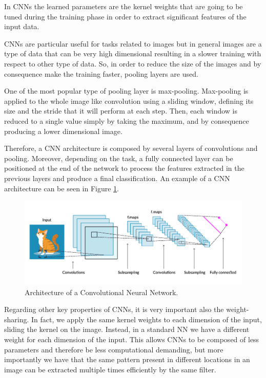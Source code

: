 \documentclass[binding=0.6cm,noexaminfo]{sapthesis}
\begin{document}
In CNNs the learned parameters are the kernel weights that are going to be tuned during the training phase in order to extract significant features of the input data. 

CNNs are particular useful for tasks related to images but in general images are a type of data that can be very high dimensional resulting in a slower training with respect to other type of data. So, in order to reduce the size of the images and by consequence make the training faster, pooling layers are used.

One of the most popular type of pooling layer is max-pooling. Max-pooling is applied to the whole image like convolution using a sliding window, defining its size and the stride that it will perform at each step. Then, each window is reduced to a single value simply by taking the maximum, and by consequence producing a lower dimensional image.

Therefore, a CNN architecture is composed by several layers of convolutions and pooling. Moreover, depending on the task, a fully connected layer can be positioned at the end of the network to process the features extracted in the previous layers and produce a final classification. An example of a CNN architecture can be seen in Figure \ref{fig:cnn}.

\begin{figure}[h!]
\centering
\includegraphics[width=\linewidth]{cnn}
\caption{Architecture of a Convolutional Neural Network.}
\label{fig:cnn}
\end{figure}

Regarding other key properties of CNNs, it is very important also the weight-sharing. In fact, we apply the same kernel weights to each dimension of the input, sliding the kernel on the image. Instead, in a standard NN we have a different weight for each dimension of the input. This allows CNNs to be composed of less parameters and therefore be less computational demanding, but more importantly we have that the same pattern present in different locations in an image can be extracted multiple times efficiently by the same filter.
\end{document}
